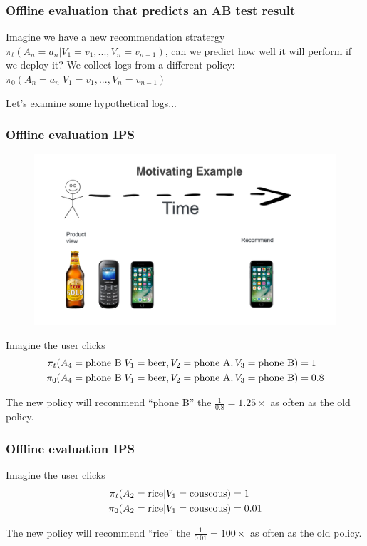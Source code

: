 \begin{frame}
  \frametitle{Offline evaluation that predicts an AB test result}

Imagine we have a new recommendation stratergy $\pi_t(A_{n}=a_n|V_1=v_1,...,V_n=v_{n-1})$, can we
predict how well it will perform if we deploy it?  We collect logs
from a different policy: $\pi_0(A_{n}=a_n|V_1=v_1,...,V_n=v_{n-1})$

\pause

Let's examine some hypothetical logs... 

 \end{frame}



\begin{frame}
  \frametitle{Offline evaluation IPS}
 
 
   \begin{figure}[h!]
     \includegraphics[scale=0.15]{images/mot_ex2.png}
       \centering
       \label{motex1}
   \end{figure}

Imagine the user clicks
\begin{align*}
     \pi_t(A_{4}= {\rm phone ~ B} {\rm }|V_1={\rm beer}, V_2={\rm phone ~ A}, V_3={\rm phone ~ B}) &= 1\\
     \pi_0(A_{4}= {\rm phone ~ B} {\rm }|V_1={\rm beer}, V_2={\rm phone ~ A}, V_3={\rm phone ~ B}) &= 0.8\\
\end{align*}

The new policy will recommend ``phone B'' the $\frac{1}{0.8}=1.25 \times$ as often as the old policy.
   
 \end{frame}




\begin{frame}
  \frametitle{Offline evaluation IPS}
 


Imagine the user clicks
\begin{align*}
     \pi_t(A_{2}= {\rm rice} {\rm }|V_1={\rm couscous}) &= 1\\
     \pi_0(A_{2}= {\rm rice} {\rm }|V_1={\rm couscous}) &= 0.01\\
\end{align*}

The new policy will recommend ``rice'' the $\frac{1}{0.01}=100 \times$ as often as the old policy.
   
 \end{frame}


